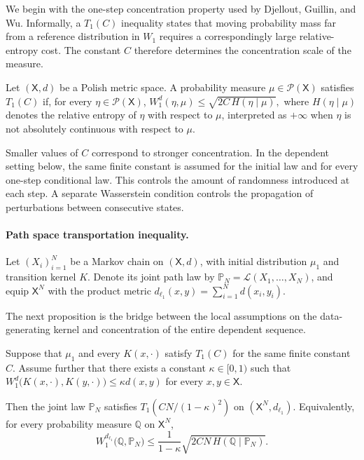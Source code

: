 We begin with the one-step concentration property used by Djellout, Guillin, and Wu. Informally, a \(T_1(C)\) inequality states that moving probability mass far from a reference distribution in \(W_1\) requires a correspondingly large relative-entropy cost. The constant \(C\) therefore determines the concentration scale of the measure.

\begin{definition}
\label{def:T1 transportation inequality}
Let \((\mathsf X,d)\) be a Polish metric space. A probability measure \(\mu\in\mathcal P(\mathsf X)\) satisfies \(T_1(C)\) if, for every \(\eta\in\mathcal P(\mathsf X)\),
\(
W_1^d(\eta,\mu)
\leqslant
\sqrt{2C\,H(\eta\mid\mu)},
\)
where \(H(\eta\mid\mu)\) denotes the relative entropy of \(\eta\) with respect to \(\mu\), interpreted as \(+\infty\) when \(\eta\) is not absolutely continuous with respect to \(\mu\).
\end{definition}

Smaller values of \(C\) correspond to stronger concentration. In the dependent setting below, the same finite constant is assumed for the initial law and for every one-step conditional law. This controls the amount of randomness introduced at each step. A separate Wasserstein condition controls the propagation of perturbations between consecutive states.

\paragraph{Path space transportation inequality.}

Let \((X_i)_{i=1}^N\) be a Markov chain on \((\mathsf X,d)\), with initial distribution \(\mu_1\) and transition kernel \(K\). Denote its joint path law by \(\mathbb P_N=\mathcal L(X_1,\ldots,X_N)\), and equip \(\mathsf X^N\) with the product metric \(d_{\ell_1}(x,y)=\sum_{i=1}^N d(x_i,y_i)\).

The next proposition is the bridge between the local assumptions on the data-generating kernel and concentration of the entire dependent sequence.

\begin{proposition}
\label{prop:Path space transportation inequality}
Suppose that \(\mu_1\) and every \(K(x,\cdot)\) satisfy \(T_1(C)\) for the same finite constant \(C\). Assume further that there exists a constant \(\kappa\in[0,1)\) such that 
\(
W_1^d
\bigl(
K(x,\cdot),
K(y,\cdot)
\bigr)
\leqslant
\kappa d(x,y)
\)
for every \(x,y\in\mathsf X\).

Then the joint law \(\mathbb P_N\) satisfies \(T_1(CN/(1-\kappa)^2)\) on \((\mathsf X^N,d_{\ell_1})\). Equivalently, for every probability measure \(\mathbb Q\) on \(\mathsf X^N\),
\[
W_1^{d_{\ell_1}}
\bigl(
\mathbb Q,
\mathbb P_N
\bigr)
\leqslant
\frac{1}{1-\kappa}
\sqrt{
2CN\,H(\mathbb Q\mid\mathbb P_N)
}.
\]
\end{proposition}

